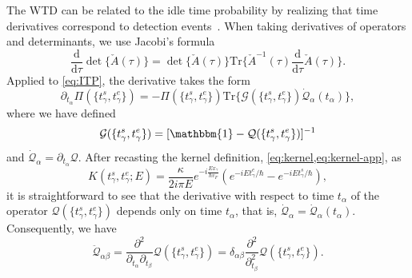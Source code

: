\documentclass[aps,prl,amsmath,twocolumn,floatfix,superscriptaddress,longbibliography,footinbib]{revtex4-1}
\begin{document}
The WTD can be related to the idle time probability by realizing that time derivatives correspond to detection events~\cite{Haack2014}. When taking derivatives of operators and determinants, we use Jacobi's formula
\begin{equation}
	\frac{\mathrm{d}}{\mathrm{d}\tau} \det\{\check{A}(\tau)\} = \det\{\check{A}(\tau)\} \mathrm{Tr} \{\check{A}^{-1}(\tau) \frac{\mathrm{d}}{\mathrm{d}\tau} \check{A}(\tau)\} .
	\label{eq:Jacobi}
\end{equation}
Applied to \cref{eq:ITP}, the derivative takes the form
\begin{equation}
	\partial_{t_\alpha} \Pi(\{t^{s}_\gamma, t^{e}_\gamma\}) = - \Pi(\{t^{s}_\gamma, t^{e}_\gamma\}) \mathrm{Tr} \{ \mathcal{G}(\{t^{s}_\gamma, t^{e}_\gamma\})  \dot{\mathcal{Q}}_\alpha (t_\alpha) \} ,
	\label{eq:deriv}
\end{equation}
where we have defined 
\begin{equation}
	\mathcal{G}(\{t^{s}_\gamma, t^{e}_\gamma\})= [\mathbbm{1} - \mathcal{Q}(\{t^{s}_\gamma, t^{e}_\gamma\}) ]^{-1}
\end{equation}
and $ \dot{\mathcal{Q}}_\alpha = \partial_{t_\alpha} \mathcal{Q} $. After recasting the kernel definition, \cref{eq:kernel,eq:kernel-app}, as 
\begin{equation}
	K(t^{s}_\gamma, t^{e}_\gamma; E)
	=\frac{\kappa}{2 i \pi E} e^{-i \frac{E x_\gamma}{\hbar v_F} }
	\left( e^{-i E t^{e}_\gamma/\hbar } - e^{-i E t^{s}_\gamma / \hbar } \right),
	\label{eq:kernel2}
\end{equation}
it is straightforward to see that the derivative with respect to time $t_\alpha$ of the operator $\mathcal{Q}(\{t^{s}_\gamma, t^{e}_\gamma\}) $ depends only on time $t_\alpha$, that is, $ \dot{\mathcal{Q}}_\alpha = \dot{\mathcal{Q}}_\alpha (t_\alpha) $. Consequently, we have 
\begin{equation}
	\ddot{\mathcal{Q}}_{\alpha\beta} = \frac{\partial^2}{\partial_{t_\alpha} \partial_{t_\beta}}\mathcal{Q}(\{t^{s}_\gamma, t^{e}_\gamma\}) = \delta_{\alpha\beta} \frac{\partial^2}{\partial_{t_\beta}^2}\mathcal{Q}(\{t^{s}_\gamma, t^{e}_\gamma\}) . 
	\label{eq:dob-der}
\end{equation}
\end{document}

